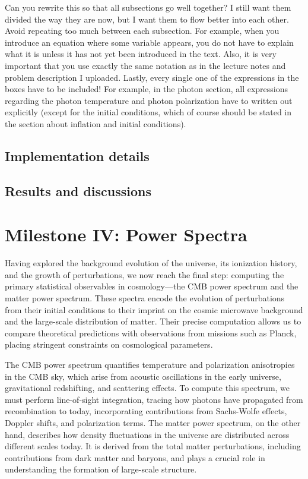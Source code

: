 \documentclass{aa}
\begin{document}
Can you rewrite this so that all subsections go well together? I still want them divided the way they are now, but I want them to flow better into each other. Avoid repeating too much between each subsection. For example, when you introduce an equation where some variable appears, you do not have to explain what it is unless it has not yet been introduced in the text. Also, it is very important that you use exactly the same notation as in the lecture notes and problem description I uploaded. Lastly, every single one of the expressions in the boxes have to be included! For example, in the photon section, all expressions regarding the photon temperature and photon polarization have to written out explicitly (except for the initial conditions, which of course should be stated in the section about inflation and initial conditions).





\subsection{Implementation details}\label{subsec: III methods}

\subsection{Results and discussions}\label{subsec: III results}







\section{Milestone IV: Power Spectra}\label{sec: milestone IV}
Having explored the background evolution of the universe, its ionization history, and the growth of perturbations, we now reach the final step: computing the primary statistical observables in cosmology—the CMB power spectrum and the matter power spectrum. These spectra encode the evolution of perturbations from their initial conditions to their imprint on the cosmic microwave background and the large-scale distribution of matter. Their precise computation allows us to compare theoretical predictions with observations from missions such as Planck, placing stringent constraints on cosmological parameters.  

The CMB power spectrum quantifies temperature and polarization anisotropies in the CMB sky, which arise from acoustic oscillations in the early universe, gravitational redshifting, and scattering effects. To compute this spectrum, we must perform line-of-sight integration, tracing how photons have propagated from recombination to today, incorporating contributions from Sachs-Wolfe effects, Doppler shifts, and polarization terms. The matter power spectrum, on the other hand, describes how density fluctuations in the universe are distributed across different scales today. It is derived from the total matter perturbations, including contributions from dark matter and baryons, and plays a crucial role in understanding the formation of large-scale structure.  
\end{document}
